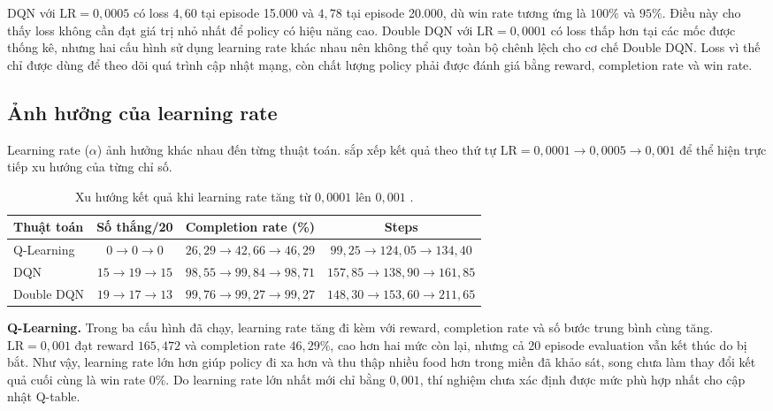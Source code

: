 DQN với $\mathrm{LR}=0{,}0005$ có loss $4{,}60$ tại episode 15.000 và $4{,}78$ tại episode 20.000, dù win rate tương ứng là $100\%$ và $95\%$. Điều này cho thấy loss không cần đạt giá trị nhỏ nhất để policy có hiệu năng cao. Double DQN với $\mathrm{LR}=0{,}0001$ có loss thấp hơn tại các mốc được thống kê, nhưng hai cấu hình sử dụng learning rate khác nhau nên không thể quy toàn bộ chênh lệch cho cơ chế Double DQN. Loss vì thế chỉ được dùng để theo dõi quá trình cập nhật mạng, còn chất lượng policy phải được đánh giá bằng reward, completion rate và win rate.

\subsection{Ảnh hưởng của learning rate}

Learning rate ($\alpha$) ảnh hưởng khác nhau đến từng thuật toán.  sắp xếp kết quả theo thứ tự $\mathrm{LR}=0{,}0001 \rightarrow 0{,}0005 \rightarrow 0{,}001$ để thể hiện trực tiếp xu hướng của từng chỉ số.

\begin{table}[H]
    \centering
    \renewcommand{\arraystretch}{1.2}
    \setlength{\tabcolsep}{4pt}
    \footnotesize
    \begin{tabular}{lccc}
        \toprule
        \textbf{Thuật toán} & \textbf{Số thắng/20} & \textbf{Completion rate (\%)} & \textbf{Steps} \\
        \midrule
        Q-Learning & $0 \rightarrow 0 \rightarrow 0$ & $26{,}29 \rightarrow 42{,}66 \rightarrow 46{,}29$ & $99{,}25 \rightarrow 124{,}05 \rightarrow 134{,}40$ \\
        DQN & $15 \rightarrow 19 \rightarrow 15$ & $98{,}55 \rightarrow 99{,}84 \rightarrow 98{,}71$ & $157{,}85 \rightarrow 138{,}90 \rightarrow 161{,}85$ \\
        Double DQN & $19 \rightarrow 17 \rightarrow 13$ & $99{,}76 \rightarrow 99{,}27 \rightarrow 99{,}27$ & $148{,}30 \rightarrow 153{,}60 \rightarrow 211{,}65$ \\
        \bottomrule
    \end{tabular}
    \caption{Xu hướng kết quả khi learning rate tăng từ $0{,}0001$ lên $0{,}001$ \cite{DRLPacmanGitHub}.}
    \label{tab:lr-trend}
\end{table}

\noindent\textbf{Q-Learning.} Trong ba cấu hình đã chạy, learning rate tăng đi kèm với reward, completion rate và số bước trung bình cùng tăng. $\mathrm{LR}=0{,}001$ đạt reward $165{,}472$ và completion rate $46{,}29\%$, cao hơn hai mức còn lại, nhưng cả 20 episode evaluation vẫn kết thúc do bị bắt. Như vậy, learning rate lớn hơn giúp policy đi xa hơn và thu thập nhiều food hơn trong miền đã khảo sát, song chưa làm thay đổi kết quả cuối cùng là win rate $0\%$. Do learning rate lớn nhất mới chỉ bằng $0{,}001$, thí nghiệm chưa xác định được mức phù hợp nhất cho cập nhật Q-table.

